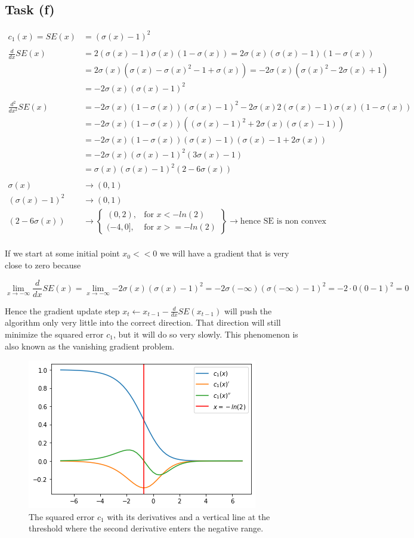 \documentclass[onecolumn]{article}
\begin{document}
\subsection{Task (f)}
\label{taskf}
\[
\begin{aligned}
	c_1(x)=SE(x) &= (\sigma(x)-1)^2 \\
	\\
	\frac{d}{d x} SE(x)&= 2(\sigma(x)-1)\sigma(x)(1-\sigma(x))=2\sigma(x)(\sigma(x)-1) (1-\sigma(x)) \\
	&=2\sigma(x)(\sigma(x)-\sigma(x)^2-1+\sigma(x))=-2\sigma(x)(\sigma(x)^2-2\sigma(x)+1) \\
	&=-2\sigma(x)(\sigma(x)-1)^2 \\
	\\
	\frac{d^2}{d x^2} SE(x)&=-2\sigma(x)(1-\sigma(x))(\sigma(x)-1)^2-2\sigma(x)2(\sigma(x)-1)\sigma(x)(1-\sigma(x))\\
	&=-2\sigma(x)(1-\sigma(x))((\sigma(x)-1)^2+2\sigma(x)(\sigma(x)-1)) \\ &=-2\sigma(x)(1-\sigma(x))(\sigma(x)-1)(\sigma(x)-1+2\sigma(x)) \\
	&=-2\sigma(x)(\sigma(x)-1)^2(3\sigma(x)-1) \\
	&=\sigma(x)(\sigma(x)-1)^2(2-6\sigma(x)) 
	\\ \\
	\sigma(x)&\to(0, 1) \\
	(\sigma(x)-1)^2&\to(0,1) \\
	(2-6\sigma(x)) &\to \left\{\begin{array}{lr}
		(0, 2), & \text{for } x < -ln(2) \\
		(-4, 0], & \text{for } x >= -ln(2)
	\end{array}\right\} \to \text{hence SE is non convex}
\end{aligned}
\]\\
If we start at some initial point $x_0 << 0$ we will have a gradient that is very close to zero because

\[
\lim_{x\to-\infty}{\frac{d}{d x} SE(x)}=\lim_{x\to-\infty}{-2\sigma(x)(\sigma(x)-1)^2 }={-2\sigma(-\infty)(\sigma(-\infty)-1)^2 }={-2\cdot 0(0-1)^2 }=0
\]

Hence the gradient update step $x_{t}\leftarrow x_{t-1}-\frac{d}{dx}SE(x_{t-1})$ will push the algorithm only very little into the correct direction. That direction will still minimize the squared error $c_1$, but it will do so very slowly. This phenomenon is also known as the vanishing gradient problem.
\begin{figure}[hbt!]
	\centering
	\includegraphics[width=.5\linewidth]{taskf.png}
	\caption{The squared error $c_1$ with its derivatives and a vertical line at the threshold where the second derivative enters the negative range.}
\end{figure}
\end{document}
